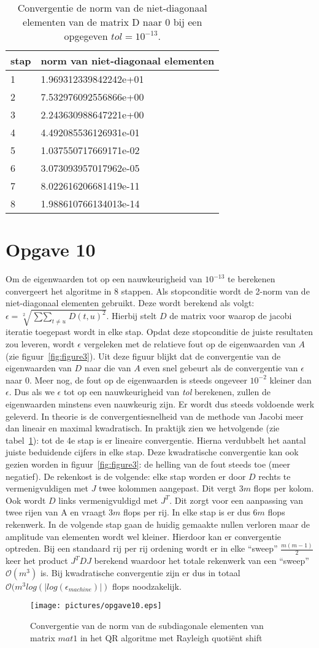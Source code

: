 \documentclass[a4paper]{article}
\newcommand{\opgave}[1]{\section*{Opgave #1}}
\begin{document}
\begin{table}[h]
\begin{tabular}{|l|l|}
\hline
stap & norm van niet-diagonaal elementen\\
\hline
1 & 1.969312339842242e+01\\
2 & 7.532976092556866e+00\\
3 & 2.243630988647221e+00\\
4 & 4.492085536126931e-01\\
5 & 1.037550717669171e-02\\
6 & 3.073093957017962e-05\\
7 & 8.022616206681419e-11\\
8 & 1.988610766134013e-14\\
\hline
\end{tabular}
\caption{Convergentie de norm van de niet-diagonaal elementen van de matrix D naar 0 bij een opgegeven $tol =10^{-13}$.}
\label{table:tab2}
\end{table}
\opgave{10}
Om de eigenwaarden tot op een nauwkeurigheid van $10^{-13}$ te berekenen convergeert het algoritme in 8 stappen. Als stopconditie wordt de 2-norm van de niet-diagonaal elementen gebruikt. Deze wordt berekend als volgt: $\epsilon = \sqrt[2]{\mathop{\sum\sum}_{t\neq u} D(t,u)^2}$. Hierbij stelt $D$ de matrix voor waarop de jacobi iteratie toegepast wordt in elke stap. Opdat deze stopconditie de juiste resultaten zou leveren, wordt $\epsilon$ vergeleken met de relatieve fout op de eigenwaarden van $A$ (zie figuur~\ref{fig:figure3}). Uit deze figuur blijkt dat de convergentie van de eigenwaarden van $D$ naar die van $A$ even snel gebeurt als de convergentie van $\epsilon$ naar 0. Meer nog, de fout op de eigenwaarden is steeds ongeveer $10^{-2}$ kleiner dan $\epsilon$. Dus als we $\epsilon$ tot op een nauwkeurigheid van \textit{tol} berekenen, zullen de eigenwaarden minstens even nauwkeurig zijn. Er wordt dus steeds voldoende werk geleverd. 
In theorie is de convergentiesnelheid van de methode van Jacobi meer dan lineair en maximal kwadratisch. In praktijk zien we hetvolgende (zie tabel~\ref{table:tab2}): tot de 4e stap is er lineaire convergentie. Hierna verdubbelt het aantal juiste beduidende cijfers in elke stap. Deze kwadratische convergentie kan ook gezien worden in figuur~\ref{fig:figure3}: de helling van de fout steeds toe (meer negatief).
De rekenkost is de volgende: elke stap worden er door $D$ rechts te vermenigvuldigen met $J$ twee kolommen aangepast. Dit vergt $3m$   flops per kolom. Ook wordt $D$ links vermenigvuldigd met $J^{T}$.  Dit zorgt voor een aanpassing van twee rijen van A en vraagt $3m$ flops per rij. In elke stap is er dus $6m$ flops rekenwerk. In de volgende stap gaan de huidig gemaakte nullen verloren maar de amplitude van elementen wordt wel kleiner. Hierdoor kan er convergentie optreden. Bij een standaard rij per rij ordening wordt er in elke “sweep” $\frac{m(m-1)}{2}$ keer het product $J^{T}D J$ berekend waardoor het totale rekenwerk van een “sweep” $\mathcal{O}(m^{3})$ is. Bij kwadratische convergentie zijn er dus in totaal $\mathcal{O}(m^{3}log(|log(\epsilon_{machine})|)$ flops noodzakelijk.


\begin{figure}
\centerline{\texttt{[image: pictures/opgave10.eps]}}
\caption{Convergentie van de norm van de subdiagonale elementen van matrix $mat1$ in het QR algoritme met Rayleigh quoti\"{e}nt shift}
\label{fig:figure 3}
\end{figure}
\end{document}
